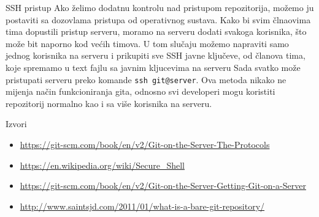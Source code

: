 \documentclass[10pt]{beamer}
\begin{document}
	\begin{frame}{SSH pristup}
		Ako želimo dodatnu kontrolu nad pristupom repozitorija, možemo ju postaviti sa dozovlama pristupa od operativnog sustava. \newline
		Kako bi svim člnaovima tima dopustili pristup serveru, moramo na serveru dodati svakoga korisnika, što može bit naporno kod većih timova.\newline
		U tom slučaju možemo napraviti samo jednog korisnika na serveru i prikupiti sve SSH javne ključeve, od članova tima, koje spremamo u text fajlu sa javnim kljucevima na serveru\newline
		Sada svatko može pristupati serveru preko komande \texttt{ssh git@server}. Ova metoda nikako ne mijenja način funkcioniranja gita, odnosno svi developeri mogu koristiti repozitorij normalno kao i sa više korisnika na serveru.

	\end{frame}

	\begin{frame}{Izvori}
		\begin{itemize}
			\item	\url{https://git-scm.com/book/en/v2/Git-on-the-Server-The-Protocols}
			\item	\url{https://en.wikipedia.org/wiki/Secure_Shell} 
			\item	\url{https://git-scm.com/book/en/v2/Git-on-the-Server-Getting-Git-on-a-Server}
			\item	\url{http://www.saintsjd.com/2011/01/what-is-a-bare-git-repository/}
		\end{itemize}


	\end{frame}
\end{document}
